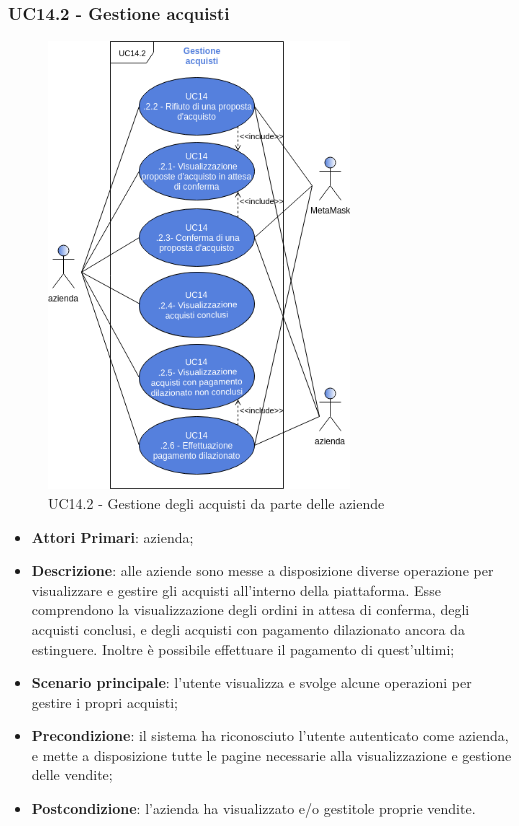 \subsubsection{UC14.2 - Gestione acquisti}
\begin{figure}[h]
	\includegraphics[width=8cm]{res/images/UC14-Acquisti.png}
	\centering
	\caption{UC14.2 - Gestione degli acquisti da parte delle aziende}
\end{figure}
\begin{itemize}
	\item \textbf{Attori Primari}: azienda;
	\item \textbf{Descrizione}: alle aziende sono messe a disposizione diverse operazione per visualizzare e gestire gli acquisti all'interno della piattaforma. Esse comprendono la visualizzazione degli ordini in attesa di conferma, degli acquisti conclusi, e degli acquisti con pagamento dilazionato ancora da estinguere. Inoltre è possibile effettuare il pagamento di quest'ultimi;
	\item \textbf{Scenario principale}: l'utente visualizza e svolge alcune operazioni per gestire i propri acquisti;
	\item \textbf{Precondizione}: il sistema ha riconosciuto l'utente autenticato come azienda, e mette a disposizione tutte le pagine necessarie alla visualizzazione e gestione delle vendite;
	\item \textbf{Postcondizione}: l'azienda ha visualizzato e/o gestitole proprie vendite.
\end{itemize} 
